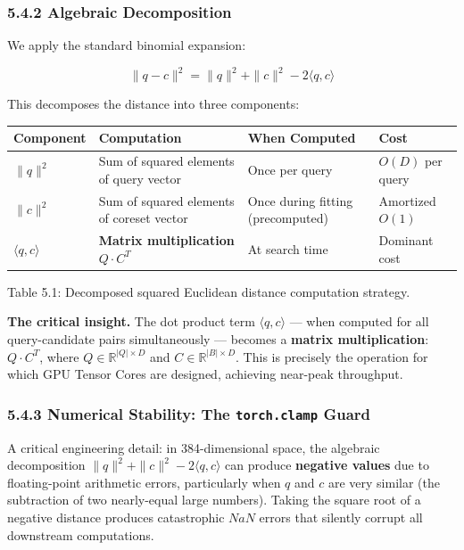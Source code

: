 \documentclass[12pt, a4paper, oneside]{report}
\begin{document}
\subsubsection{5.4.2 Algebraic Decomposition}\label{algebraic-decomposition}

We apply the standard binomial expansion:

\[\|q - c\|^2 = \|q\|^2 + \|c\|^2 - 2 \langle q, c \rangle\]

This decomposes the distance into three components:

{\def\LTcaptype{none} %
\begin{longtable}[]{@{}llll@{}}
\toprule\noalign{}
Component & Computation & When Computed & Cost \\
\midrule\noalign{}
\endhead
\bottomrule\noalign{}
\endlastfoot
\(\|q\|^2\) & Sum of squared elements of query vector & Once per query & \(O(D)\) per query \\
\(\|c\|^2\) & Sum of squared elements of coreset vector & Once during fitting (precomputed) & Amortized \(O(1)\) \\
\(\langle q, c \rangle\) & \textbf{Matrix multiplication} \(Q \cdot C^T\) & At search time & Dominant cost \\
\end{longtable}
}

Table 5.1: Decomposed squared Euclidean distance computation strategy.

\textbf{The critical insight.} The dot product term \(\langle q, c \rangle\) --- when computed for all query-candidate pairs simultaneously --- becomes a \textbf{matrix multiplication}: \(Q \cdot C^T\), where \(Q \in \mathbb{R}^{|Q| \times D}\) and \(C \in \mathbb{R}^{|B| \times D}\). This is precisely the operation for which GPU Tensor Cores are designed, achieving near-peak throughput.

\subsubsection{\texorpdfstring{5.4.3 Numerical Stability: The \texttt{torch.clamp} Guard}{5.4.3 Numerical Stability: The torch.clamp Guard}}\label{numerical-stability-the-torch.clamp-guard}

A critical engineering detail: in 384-dimensional space, the algebraic decomposition \(\|q\|^2 + \|c\|^2 - 2\langle q, c \rangle\) can produce \textbf{negative values} due to floating-point arithmetic errors, particularly when \(q\) and \(c\) are very similar (the subtraction of two nearly-equal large numbers). Taking the square root of a negative distance produces catastrophic \(NaN\) errors that silently corrupt all downstream computations.
\end{document}
